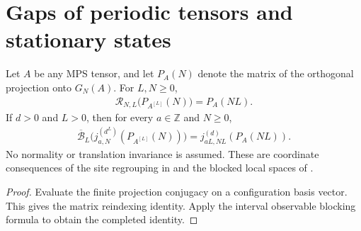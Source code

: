 \section{Gaps of periodic tensors and stationary states}

\begin{lemma}
    \label{thm:blocked_ground_projection_observable}
    \leanok
    Let $A$ be any MPS tensor, and let $P_A(N)$ denote the matrix of the
    orthogonal projection onto $G_N(A)$. For $L,N\geq0$,
    \begin{align}
        \mathcal R_{N,L}\bigl(P_{A^{[L]}}(N)\bigr)=P_A(NL).
    \end{align}
    If $d>0$ and $L>0$, then for every $a\in\mathbb Z$ and $N\geq0$,
    \begin{align}
        \overline{\mathcal B}_L
        \bigl(j^{(d^L)}_{a,N}(P_{A^{[L]}}(N))\bigr)
        =j^{(d)}_{aL,NL}(P_A(NL)).
    \end{align}
    No normality or translation invariance is assumed. These are coordinate
    consequences of the site regrouping in
    \cite[lines~825--836]{Nachtergaele1996Spectral} and the blocked local
    spaces of \cite[lines~1815--1820 and 1985--1992]{Cirac2021Matrix}.
\end{lemma}
\begin{proof}\leanok
    Evaluate the finite projection conjugacy on a configuration basis vector.
    This gives the matrix reindexing identity. Apply the interval observable
    blocking formula to obtain the completed identity.
\end{proof}

